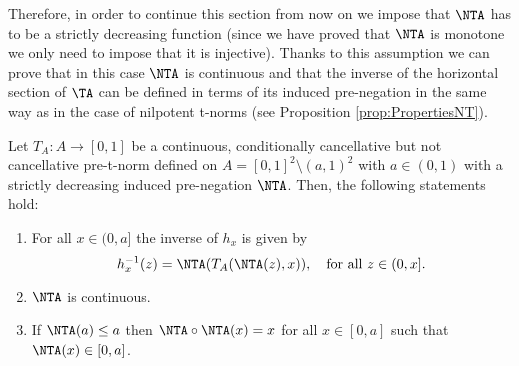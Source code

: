 Therefore, in order to continue this section from now on we impose that $\NTA$ has to be a strictly decreasing function (since we have proved that $\NTA$ is monotone we only need to impose that it is injective). Thanks to this assumption we can prove that in this case $\NTA$ is continuous and that the inverse of the horizontal section of $\TA$ can be defined in terms of its induced pre-negation in the same way as in the case of nilpotent t-norms (see Proposition \ref{prop:PropertiesNT}).
\begin{proposition}\label{prop:(a,1)propNTA2} Let $T_A:A \to [0,1]$ be a continuous, conditionally cancellative but not cancellative pre-t-norm defined on $A=[0,1]^2 \setminus (a,1)^2$ with $a \in (0,1)$ with a strictly decreasing induced pre-negation $\NTA$. Then, the following statements hold:
	\begin{enumerate}[label=(\roman*)]
		\item For all $x \in (0,a]$ the inverse of $h_x$ is given by
		\begin{equation}\label{eq:PropertyHorizontalSectionCompletion(a,1)}
			h_x^{-1}(z)=\NTA(T_A(\NTA(z),x)), \quad \text{for all } z \in (0,x].
		\end{equation}
		\item $\NTA$ is continuous.
		\item If $\NTA(a) \leq a$ then $\NTA \circ \NTA(x)=x$ for all $x \in [0,a]$ such that $\NTA(x) \in [0,a]$.
	\end{enumerate}	
\end{proposition}

